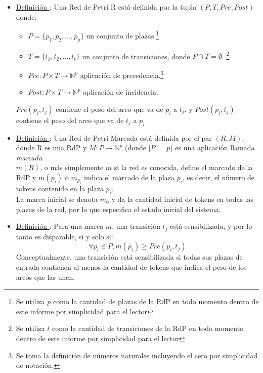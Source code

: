\begin{itemize}
  \item \underline{Definición \thedefinitionsCounter}: Una Red de Petri R está
  definida por la tupla $(P, T, Pre, Post)$ donde:
  \begin{itemize}
    \item $ P = \{ p_1, p_2, \ldots, p_p \} $ un conjunto de plazas.\footnote{Se
    utiliza $p$ como la cantidad de plazas de la RdP en todo momento dentro de este informe por simplicidad para el lector}
    \item $ T = \{ t_1, t_2, \ldots, t_t \} $ un conjunto de transiciones, donde
    $ P \cap T = \emptyset $. \footnote{Se utiliza $t$ como la cantidad de
    transiciones de la RdP en todo momento dentro de este informe por
    simplicidad para el lector}
    \item $ Pre: P \times T \rightarrow \mathbb{N}^{p} $ aplicación de
    precedencia.\footnote{Se toma la definición de números naturales incluyendo
    el cero por simplicidad de notación.}
    \item $ Post: P \times T \rightarrow \mathbb{N}^{p} $ aplicación de
    incidencia.
  \end{itemize}
  $ Pre (p_i, t_j) $ contiene el peso del arco que va de $ p_i $ a $ t_j $, y
  $ Post (p_i, t_j) $ contiene el peso del arco que va de $ t_j $ a $ p_i $

  \item \underline{Definición \thedefinitionsCounter}: Una Red de Petri Marcada está
  definida por el par $(R, M)$, donde R es una RdP y $ M : P \rightarrow
  \mathbb{N}^{p}$ (donde $\left\vert{P}\right\vert = p $) es una aplicación
  llamada \textit{marcado}.\\
  $m(R)$, o más simplemente $m$ si la red es conocida, define el marcado de la
  RdP y $m(p_{i})$ o $m_{p_{i}}$ indica el marcado de la plaza $p_{i}$, es
  decir, el número de tokens contenido en la plaza $p_{i}$.\\
  La marca inicial se denota $m_{0}$ y da la cantidad inicial de tokens en todas
  las plazas de la red, por lo que especifica el estado inicial del sistema.
  
  \item \underline{Definición \thedefinitionsCounter}: Para una marca $m$, una transición $t_{j}$
  está sensibilizada, y por lo tanto es disparable, si y solo si:\\
  $$ \forall p_{i} \in P, m(p_i) \geq Pre(p_{i}, t_{j}) $$
  Conceptualmente, una transición está sensibilizada si todas sus plazas de
  entrada contienen al menos la cantidad de tokens que indica el peso de los
  arcos que las unen.


\end{itemize}
